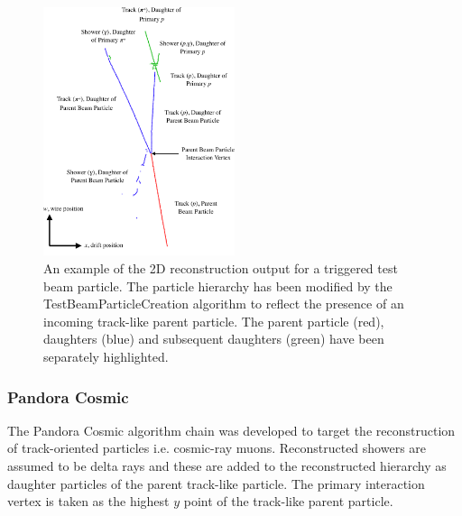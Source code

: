 \begin{figure}
\centering
\includegraphics[width=0.5\textwidth]{Figures/EventDisplays/MC/TestBeamParticleCreation.pdf}
\caption{An example of the 2D reconstruction output for a triggered test beam particle.  The particle hierarchy has been modified by the TestBeamParticleCreation algorithm to reflect the presence of an incoming track-like parent particle.  The parent particle (red), daughters (blue) and subsequent daughters (green) have been separately highlighted.}
\label{fig:testbeamcreation}
\end{figure}

\subsubsection{Pandora Cosmic}
\label{sec:pandoracosmic}
The Pandora Cosmic algorithm chain \cite{pandorauboone} was developed to target the reconstruction of track-oriented particles i.e. cosmic-ray muons.  Reconstructed showers are assumed to be delta rays and these are added to the reconstructed hierarchy as daughter particles of the parent track-like particle.  The primary interaction vertex is taken as the highest $y$ point of the track-like parent particle.

